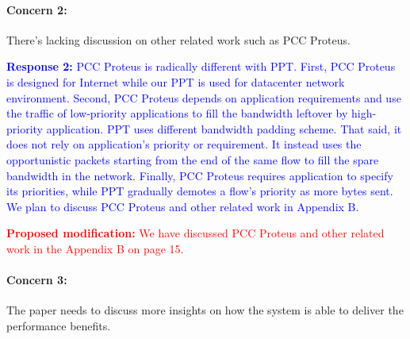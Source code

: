 \documentclass[12pt,one-column]{article}
\begin{document}
{\it \paragraph{Concern 2:} There's lacking discussion on other related work such as PCC Proteus.}

\noindent\textcolor{blue}{\textbf{Response 2:} PCC Proteus is radically different with PPT.
First, PCC Proteus is designed for Internet while our PPT is used for datacenter network environment.
Second, PCC Proteus depends on application requirements and use the traffic of low-priority applications to fill the bandwidth leftover by high-priority application. PPT uses different bandwidth padding scheme. That said, it does not rely on application's priority or requirement. It instead uses the opportunistic packets starting from the end of the same flow to fill the spare bandwidth in the network.
Finally, PCC Proteus requires application to specify its priorities, while PPT gradually demotes a flow's priority as more bytes sent. We plan to discuss PCC Proteus and other related work in Appendix B.}

\noindent\textcolor{red}{\textbf{Proposed modification: }
We have discussed PCC Proteus and other related work in the Appendix B on page 15.
}







{\it \paragraph{Concern 3:} The paper needs to discuss more insights on how the system is able to deliver the performance benefits.}
\end{document}
